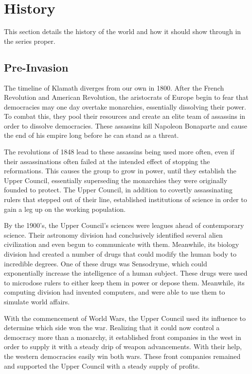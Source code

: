 \documentclass{article}
\begin{document}
\section{History}

This section details the history of the world and how it should show through in the series proper.

\subsection{Pre-Invasion}

The timeline of Klamath diverges from our own in 1800. After the French Revolution and American Revolution, the aristocrats of Europe begin to fear that democracies may one day overtake monarchies, essentially dissolving their power. To combat this, they pool their resources and create an elite team of assassins in order to dissolve democracies. These assassins kill Napoleon Bonaparte and cause the end of his empire long before he can stand as a threat.

The revolutions of 1848 lead to these assassins being used more often, even if their assassinations often failed at the intended effect of stopping the reformations. This causes the group to grow in power, until they establish the Upper Council, essentially superseding the monarchies they were originally founded to protect. The Upper Council, in addition to covertly assassinating rulers that stepped out of their line, established institutions of science in order to gain a leg up on the working population.

By the 1900's, the Upper Council's sciences were leagues ahead of contemporary science. Their astronomy division had conclusively identified several alien civilization and even begun to communicate with them. Meanwhile, its biology division had created a number of drugs that could modify the human body to incredible degrees. One of these drugs was Sensodryme, which could exponentially increase the intelligence of a human subject. These drugs were used to microdose rulers to either keep them in power or depose them. Meanwhile, its computing division had invented computers, and were able to use them to simulate world affairs.

With the commencement of World Wars, the Upper Council used its influence to determine which side won the war. Realizing that it could now control a democracy more than a monarchy, it established front companies in the west in order to supply it with a steady drip of weapon advancements. With their help, the western democracies easily win both wars. These front companies remained and supported the Upper Council with a steady supply of profits.
\end{document}
